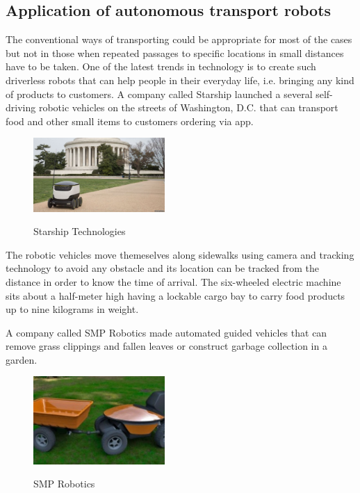 \documentclass[12pt,english]{article}
\begin{document}
\subsection{Application of autonomous transport robots}
The conventional ways of transporting could be appropriate for most of the cases but not in those when repeated passages to specific locations in small distances have to be taken.
One of the latest trends in technology is to create such driverless robots that can help people in their everyday life, i.e. bringing any kind of products to customers. A company called Starship launched a several self-driving robotic vehicles on the streets of Washington, D.C. that can transport food and other small items to customers ordering via app.
\begin{figure}[h]
	\centering
	\includegraphics[width=5cm]{starship.jpg}
	\label{fig1}
	\caption{Starship Technologies}
\end{figure}
The robotic vehicles move themeselves along sidewalks using camera and tracking technology to avoid any obstacle and its location can be tracked from the distance in order to know the time of arrival. The six-wheeled electric machine sits about a half-meter high having a lockable cargo bay to carry food products up to nine kilograms in weight.\cite{starship}




A company called SMP Robotics made automated guided vehicles that can remove grass clippings and fallen leaves or construct garbage collection in a garden. 
\begin{figure}[h]
	\centering
	\includegraphics[width=5cm]{smp.jpg}
	\label{smp}
	\caption{SMP Robotics}
\end{figure}
\end{document}
